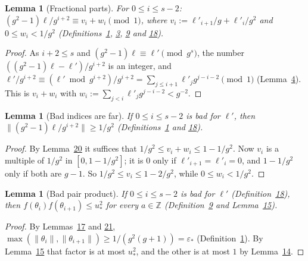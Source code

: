 \documentclass[11pt]{article}
\newcounter{hffc}
\theoremstyle{definition}\newtheorem{hffdef}[hffc]{Definition}
\theoremstyle{plain}\newtheorem{hfflem}[hffc]{Lemma}\newtheorem{hffthm}[hffc]{Theorem}
\theoremstyle{remark}\newtheorem{hffrem}[hffc]{Remark}
\newcommand{\hffcost}{}
\newcommand{\setcost}[1]{\renewcommand{\hffcost}{#1}}
\newcommand{\Z}{\mathbb{Z}}\newcommand{\R}{\mathbb{R}}\newcommand{\N}{\mathbb{N}}
\begin{document}
\begin{hfflem}[Fractional parts]\label{L:frac}
For $0\le i\le s-2$: $(g^2-1)\ell/g^{i+2}\equiv v_i+w_i\pmod1$, where $v_i:=\ell'_{i+1}/g+\ell'_i/g^2$ and $0\le w_i<1/g^2$ (Definitions~\hyperref[D:conv]{1}, \hyperref[D:digits]{3}, \hyperref[D:psi]{9} and \hyperref[D:bad]{18}).
\par\nopagebreak{}
\end{hfflem}
\begin{proof}\setcost{length 159/300}As $i+2\le s$ and $(g^2-1)\ell\equiv\ell'\pmod{g^s}$, the number $((g^2-1)\ell-\ell')/g^{i+2}$ is an integer, and $\ell'/g^{i+2}\equiv(\ell'\bmod g^{i+2})/g^{i+2}=\sum_{j\le i+1}\ell'_jg^{j-i-2}\pmod1$ (Lemma~\hyperref[L:window]{4}). This is $v_i+w_i$ with $w_i:=\sum_{j<i}\ell'_jg^{j-i-2}<g^{-2}$.
\end{proof}

\begin{hfflem}[Bad indices are far]\label{L:badfar}
If $0\le i\le s-2$ is bad for $\ell'$, then $\|(g^2-1)\ell/g^{i+2}\|\ge1/g^2$ (Definitions~\hyperref[D:conv]{1} and \hyperref[D:bad]{18}).
\par\nopagebreak{}
\end{hfflem}
\begin{proof}\setcost{length 157/300}By Lemma~\hyperref[L:frac]{20} it suffices that $1/g^2\le v_i+w_i\le1-1/g^2$. Now $v_i$ is a multiple of $1/g^2$ in $[0,1-1/g^2]$; it is $0$ only if $\ell'_{i+1}=\ell'_i=0$, and $1-1/g^2$ only if both are $g-1$. So $1/g^2\le v_i\le1-2/g^2$, while $0\le w_i<1/g^2$.
\end{proof}

\begin{hfflem}[Bad pair product]\label{L:badprod}
If $0\le i\le s-2$ is bad for $\ell'$ (Definition~\hyperref[D:bad]{18}), then $f(\theta_i)f(\theta_{i+1})\le u_*^2$ for every $a\in\Z$ (Definition~\hyperref[D:psi]{9} and Lemma~\hyperref[L:gap]{15}).
\par\nopagebreak{}
\end{hfflem}
\begin{proof}\setcost{length 122/300}By Lemmas~\hyperref[L:far2]{17} and \hyperref[L:badfar]{21}, $\max(\|\theta_i\|,\|\theta_{i+1}\|)\ge1/(g^2(g+1))=\varepsilon_*$ (Definition~\hyperref[D:conv]{1}). By Lemma~\hyperref[L:gap]{15} that factor is at most $u_*^2$, and the other is at most $1$ by Lemma~\hyperref[L:f]{14}.
\end{proof}
\end{document}
